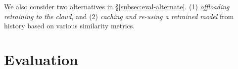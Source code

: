 We also consider two alternatives in \S\ref{subsec:eval-alternate}. 
(1) {\em offloading retraining to the cloud}, and %
(2) {\em caching and re-using a retrained model} from history based on various similarity metrics.













\section{Evaluation}
\label{sec:evaluation}

